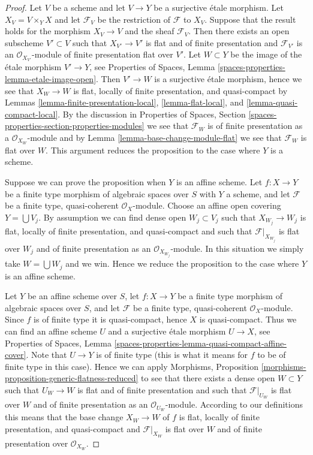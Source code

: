 \documentclass{stacks-project}
\theoremstyle{plain}
\theoremstyle{definition}
\theoremstyle{remark}
\numberwithin{equation}{subsection}
\begin{document}
\begin{proof}
Let $V$ be a scheme and let $V \to Y$ be a surjective \'etale morphism.
Let $X_V = V \times_Y X$ and let $\mathcal{F}_V$ be the restriction of
$\mathcal{F}$ to $X_V$. Suppose that the result holds for the morphism
$X_V \to V$ and the sheaf $\mathcal{F}_V$. Then there exists an open subscheme
$V' \subset V$ such that $X_{V'} \to V'$ is flat and of finite presentation
and $\mathcal{F}_{V'}$ is an $\mathcal{O}_{X_{V'}}$-module of finite
presentation flat over $V'$. Let $W \subset Y$ be the image of
the \'etale morphism $V' \to Y$, see
Properties of Spaces, Lemma \ref{spaces-properties-lemma-etale-image-open}.
Then $V' \to W$ is a surjective \'etale morphism, hence we see that
$X_W \to W$ is flat, locally of finite presentation, and quasi-compact by
Lemmas \ref{lemma-finite-presentation-local},
\ref{lemma-flat-local}, and
\ref{lemma-quasi-compact-local}.
By the discussion in
Properties of Spaces, Section
\ref{spaces-properties-section-properties-modules}
we see that $\mathcal{F}_W$ is of finite presentation as a
$\mathcal{O}_{X_W}$-module and by
Lemma \ref{lemma-base-change-module-flat}
we see that $\mathcal{F}_W$ is flat over $W$. This argument
reduces the proposition to the case where $Y$ is a scheme.

\medskip\noindent
Suppose we can prove the proposition when $Y$ is an affine scheme.
Let $f : X \to Y$ be a finite type morphism of algebraic spaces
over $S$ with $Y$ a scheme, and let $\mathcal{F}$ be a finite type,
quasi-coherent $\mathcal{O}_X$-module. Choose an affine open covering
$Y = \bigcup V_j$. By assumption we can find dense open $W_j \subset V_j$
such that $X_{W_j} \to W_j$ is flat, locally of finite presentation, and
quasi-compact and such that $\mathcal{F}|_{X_{W_j}}$ is flat over $W_j$
and of finite presentation as an $\mathcal{O}_{X_{W_j}}$-module. In this
situation we simply take $W = \bigcup W_j$ and we win. Hence we reduce
the proposition to the case where $Y$ is an affine scheme.

\medskip\noindent
Let $Y$ be an affine scheme over $S$, let
$f : X \to Y$ be a finite type morphism of algebraic spaces
over $S$, and let $\mathcal{F}$ be a finite type,
quasi-coherent $\mathcal{O}_X$-module. Since $f$ is of finite type
it is quasi-compact, hence $X$ is quasi-compact. Thus we can find
an affine scheme $U$ and a surjective \'etale morphism $U \to X$, see
Properties of Spaces, Lemma
\ref{spaces-properties-lemma-quasi-compact-affine-cover}.
Note that $U \to Y$ is of finite type (this is what it means for
$f$ to be of finite type in this case). Hence we can apply
Morphisms, Proposition \ref{morphisms-proposition-generic-flatness-reduced}
to see that there exists a dense open $W \subset Y$ such that
$U_W \to W$ is flat and of finite presentation and such that
$\mathcal{F}|_{U_W}$ is flat over $W$ and of finite presentation
as an $\mathcal{O}_{U_W}$-module. According to our definitions this means that
the base change $X_W \to W$ of $f$ is flat, locally of finite presentation,
and quasi-compact and $\mathcal{F}|_{X_W}$ is flat over $W$ and of
finite presentation over $\mathcal{O}_{X_W}$.
\end{proof}
\end{document}
